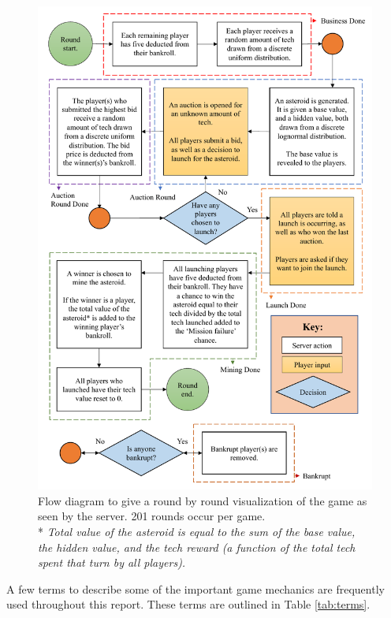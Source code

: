 \documentclass[11pt, twoside]{article}
\begin{document}
\begin{figure}
	\centering
	\includegraphics[width=\textwidth, height=0.9\textheight,keepaspectratio]{NewGameDesign.pdf}
	\caption{Flow diagram to give a round by round visualization of the game as seen by the server. 201 rounds occur per game.\\
		* \textit{Total value of the asteroid is equal to the sum of the base value, the hidden value, and the tech reward (a function of the total tech spent that turn by all players).}}
	\label{GameVisual}
\end{figure}

A few terms to describe some of the important game mechanics are frequently used throughout this report. These terms are outlined in Table \ref{tab:terms}.
\end{document}
